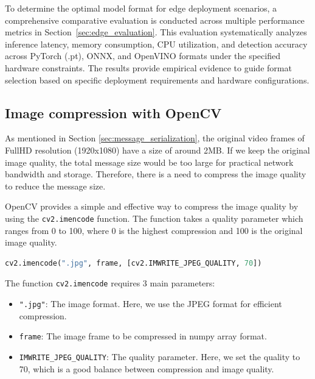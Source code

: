To determine the optimal model format for edge deployment scenarios, a comprehensive comparative evaluation is conducted across multiple performance metrics in Section~\ref{sec:edge_evaluation}. This evaluation systematically analyzes inference latency, memory consumption, CPU utilization, and detection accuracy across PyTorch (.pt), ONNX, and OpenVINO formats under the specified hardware constraints. The results provide empirical evidence to guide format selection based on specific deployment requirements and hardware configurations.


\subsection{Image compression with OpenCV}
\label{sec:edge_image_compression}

As mentioned in Section \ref{sec:message_serialization}, the original video frames of FullHD resolution (1920x1080) have a size of around 2MB. If we keep the original image quality, the total message size would be too large for practical network bandwidth and storage. Therefore, there is a need to compress the image quality to reduce the message size.

OpenCV provides a simple and effective way to compress the image quality by using the \texttt{cv2.imencode} function. The function takes a quality parameter which ranges from 0 to 100, where 0 is the highest compression and 100 is the original image quality.

\begin{lstlisting}[language=python, caption={Image compression with OpenCV}]
cv2.imencode(".jpg", frame, [cv2.IMWRITE_JPEG_QUALITY, 70])
\end{lstlisting}

The function \texttt{cv2.imencode} requires 3 main parameters:
\begin{itemize}
    \item \texttt{".jpg"}: The image format. Here, we use the JPEG format for efficient compression.
    \item \texttt{frame}: The image frame to be compressed in numpy array format.
    \item \texttt{IMWRITE\_JPEG\_QUALITY}: The quality parameter. Here, we set the quality to 70, which is a good balance between compression and image quality.
\end{itemize}

